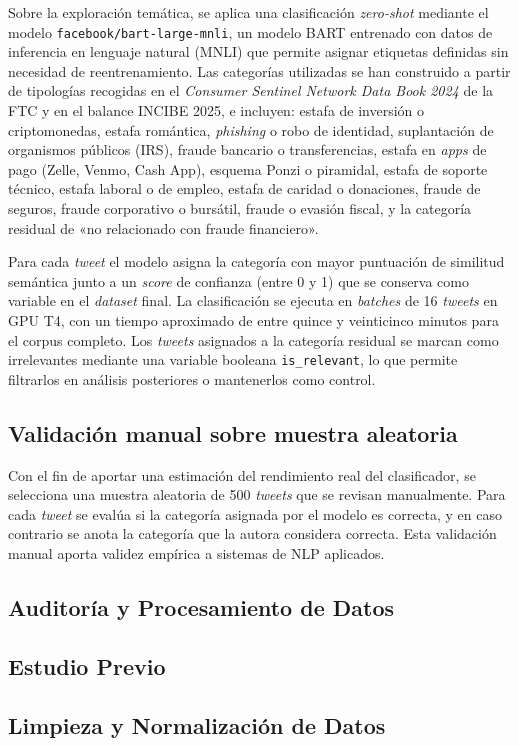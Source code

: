 Sobre la exploración temática, se aplica una clasificación \textit{zero-shot} mediante el modelo \texttt{facebook/bart-large-mnli}, un modelo BART entrenado con datos de inferencia en lenguaje natural (MNLI) que permite asignar etiquetas definidas sin necesidad de reentrenamiento. Las categorías utilizadas se han construido a partir de tipologías recogidas en el \textit{Consumer Sentinel Network Data Book 2024} de la FTC y en el balance INCIBE 2025, e incluyen: estafa de inversión o criptomonedas, estafa romántica, \textit{phishing} o robo de identidad, suplantación de organismos públicos (IRS), fraude bancario o transferencias, estafa en \textit{apps} de pago (Zelle, Venmo, Cash App), esquema Ponzi o piramidal, estafa de soporte técnico, estafa laboral o de empleo, estafa de caridad o donaciones, fraude de seguros, fraude corporativo o bursátil, fraude o evasión fiscal, y la categoría residual de «no relacionado con fraude financiero».

Para cada \textit{tweet} el modelo asigna la categoría con mayor puntuación de similitud semántica junto a un \textit{score} de confianza (entre 0 y 1) que se conserva como variable en el \textit{dataset} final. La clasificación se ejecuta en \textit{batches} de 16 \textit{tweets} en GPU T4, con un tiempo aproximado de entre quince y veinticinco minutos para el corpus completo. Los \textit{tweets} asignados a la categoría residual se marcan como irrelevantes mediante una variable booleana \texttt{is\_relevant}, lo que permite filtrarlos en análisis posteriores o mantenerlos como control.

\subsection{Validación manual sobre muestra aleatoria}

Con el fin de aportar una estimación del rendimiento real del clasificador, se selecciona una muestra aleatoria de 500 \textit{tweets} que se revisan manualmente. Para cada \textit{tweet} se evalúa si la categoría asignada por el modelo es correcta, y en caso contrario se anota la categoría que la autora considera correcta. Esta validación manual aporta validez empírica a sistemas de NLP aplicados.

\subsection{Auditoría y Procesamiento de Datos}


\subsection{Estudio Previo}


\subsection{Limpieza y Normalización de Datos}

